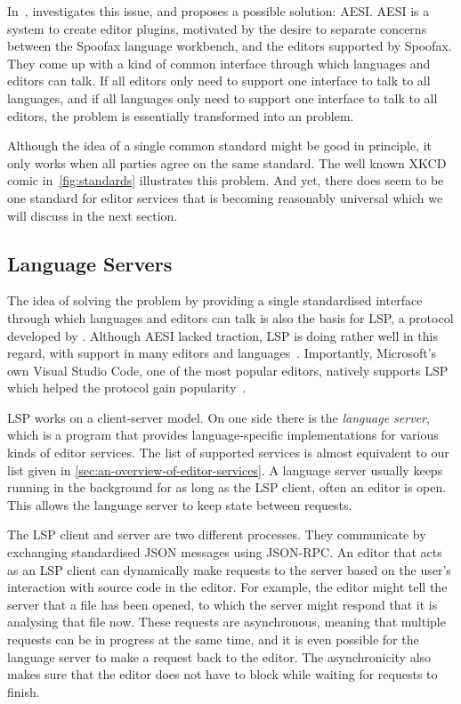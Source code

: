 In~, \textcite{Pelsmaeker2018} investigates this issue, and proposes a possible solution: \ac{AESI}.
\ac{AESI} is a system to create editor plugins, motivated by the desire to separate concerns between the Spoofax language workbench, and the editors supported by Spoofax.
They come up with a kind of common interface through which languages and editors can talk.
If all editors only need to support one interface to talk to all languages, and if all languages only need to support one
interface to talk to all editors, the \problem{\times} problem is essentially transformed into an \problem{+} problem.

Although the idea of a single common standard might be good in principle, it only works when all parties agree on the same standard.
The well known XKCD comic in~\cref{fig:standards} illustrates this problem.
And yet, there does seem to be one standard for editor services that is becoming reasonably universal which we will discuss in the next section.

\subsection{Language Servers}\label{subsec:language-servers}

The idea of solving the \problem{\times} problem by providing a single standardised interface through which languages and editors can talk
is also the basis for \ac{LSP}, a protocol developed by \textcite{lsp}.
Although \ac{AESI} lacked traction, \ac{LSP} is doing rather well in this regard, with support in many editors and languages~\citeyear{lsp_support}.
Importantly, Microsoft's own Visual Studio Code, one of the most popular editors, natively supports \ac{LSP} which helped the protocol gain popularity~\autocite{popularide}.

\ac{LSP} works on a client-server model.
On one side there is the \emph{language server}, which is a program that provides language-specific implementations for various kinds of editor services.
The list of supported services is almost equivalent to our list given in \cref{sec:an-overview-of-editor-services}.
A language server usually keeps running in the background for as long as the \ac{LSP} client, often an editor is open.
This allows the language server to keep state between requests.

The \ac{LSP} client and server are two different processes.
They communicate by exchanging standardised JSON messages using \acs{JSON-RPC}.
An editor that acts as an \ac{LSP} client can dynamically make requests to the server based on the user's interaction with source code in the editor.
For example, the editor might tell the server that a file has been opened, to which the server might respond that it is analysing that file now.
These requests are asynchronous, meaning that multiple requests can be in progress at the same time, and it is even possible for the language server to make a request back to the editor.
The asynchronicity also makes sure that the editor does not have to block while waiting for requests to finish.

